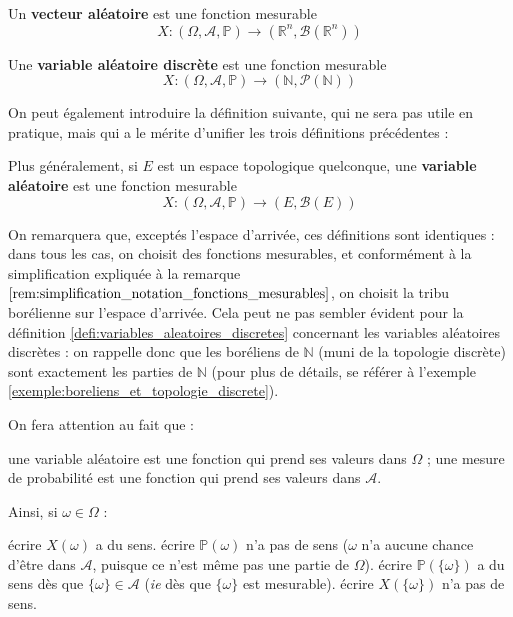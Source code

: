 \documentclass[../integ-proba.tex]{subfiles}
\begin{document}
\begin{defi}
    Un \textbf{vecteur aléatoire} est une fonction mesurable
    $$X:\left(\Omega, \mathcal{A}, \mathbb{P}\right) \longrightarrow \left(\mathbb{R}^n, \mathcal{B}(\mathbb{R}^n)\right)$$
\end{defi}

\begin{defi}
    \label{defi:variables_aleatoires_discretes}
    Une \textbf{variable aléatoire discrète} est une fonction mesurable
    $$X:\left(\Omega, \mathcal{A}, \mathbb{P}\right) \longrightarrow \left(\mathbb{N}, \mathcal{P}(\mathbb{N})\right)$$
\end{defi}

On peut également introduire la définition suivante, qui ne sera pas utile en pratique, mais qui a le mérite d'unifier les trois définitions précédentes :

\begin{defi}
    Plus généralement, si $E$ est un espace topologique quelconque, une \textbf{variable aléatoire} est une fonction mesurable
    $$X:\left(\Omega, \mathcal{A}, \mathbb{P}\right) \longrightarrow \left(E, \mathcal{B}(E)\right)$$
\end{defi}

\begin{rem}
    On remarquera que, exceptés l'espace d'arrivée, ces définitions sont identiques : dans tous les cas, on choisit des fonctions mesurables, et conformément à la simplification expliquée à la remarque $\ref{rem:simplification_notation_fonctions_mesurables}$, on choisit la tribu borélienne sur l'espace d'arrivée.
    Cela peut ne pas sembler évident pour la définition \ref{defi:variables_aleatoires_discretes} concernant les variables aléatoires discrètes : on rappelle donc que les boréliens de $\mathbb{N}$ (muni de la topologie discrète) sont exactement les parties de $\mathbb{N}$ (pour plus de détails, se référer à l'exemple \ref{exemple:boreliens_et_topologie_discrete}).
\end{rem}

\begin{rem}
    On fera attention au fait que :
    \begin{itemize}
        \itemb une variable aléatoire est une fonction qui prend ses valeurs dans $\Omega$ ;
        \itemb une mesure de probabilité est une fonction qui prend ses valeurs dans $\mathcal{A}$.
    \end{itemize}
    Ainsi, si $\omega \in \Omega$ :
    \begin{itemize}
        \itemb écrire $X(\omega)$ a du sens.
        \itemb écrire $\mathbb{P}(\omega)$ n'a pas de sens ($\omega$ n'a aucune chance d'être dans $\mathcal{A}$, puisque ce n'est même pas une partie de $\Omega$).
        \itemb écrire $\mathbb{P}(\{\omega\})$ a du sens dès que $\{\omega\}\in \mathcal{A}$ (\textit{ie} dès que $\{\omega\}$ est mesurable).
        \itemb écrire $X(\{\omega\})$ n'a pas de sens.
    \end{itemize}
\end{rem}
\end{document}
